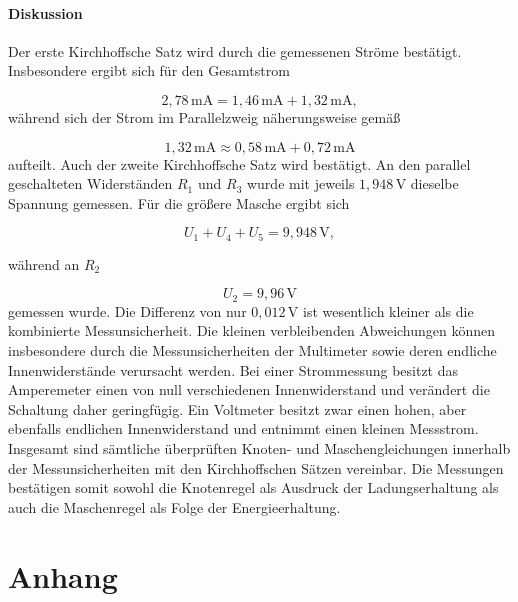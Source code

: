 \documentclass{report}
\begin{document}
\subsubsection{Diskussion}
\noindent
Der erste Kirchhoffsche Satz wird durch die gemessenen Ströme bestätigt.
Insbesondere ergibt sich für den Gesamtstrom

\begin{equation}
2{,}78\,\mathrm{mA}
=
1{,}46\,\mathrm{mA}
+
1{,}32\,\mathrm{mA},
\end{equation}
\noindent
während sich der Strom im Parallelzweig näherungsweise gemäß

\begin{equation}
1{,}32\,\mathrm{mA}
\approx
0{,}58\,\mathrm{mA}
+
0{,}72\,\mathrm{mA}
\end{equation}
\noindent
aufteilt.
\noindent
Auch der zweite Kirchhoffsche Satz wird bestätigt. An den parallel geschalteten
Widerständen $R_1$ und $R_3$ wurde mit jeweils $1{,}948\,\mathrm{V}$ dieselbe
Spannung gemessen. Für die größere Masche ergibt sich

\begin{equation}
U_1+U_4+U_5
=
9{,}948\,\mathrm{V},
\end{equation}

während an $R_2$

\begin{equation}
U_2=9{,}96\,\mathrm{V}
\end{equation}
\noindent
gemessen wurde. Die Differenz von nur $0{,}012\,\mathrm{V}$ ist wesentlich
kleiner als die kombinierte Messunsicherheit.
\noindent
Die kleinen verbleibenden Abweichungen können insbesondere durch die
Messunsicherheiten der Multimeter sowie deren endliche Innenwiderstände verursacht
werden. Bei einer Strommessung besitzt das Amperemeter einen von null verschiedenen
Innenwiderstand und verändert die Schaltung daher geringfügig. Ein Voltmeter besitzt
zwar einen hohen, aber ebenfalls endlichen Innenwiderstand und entnimmt einen kleinen
Messstrom.
\noindent
Insgesamt sind sämtliche überprüften Knoten- und Maschengleichungen innerhalb
der Messunsicherheiten mit den Kirchhoffschen Sätzen vereinbar. Die Messungen
bestätigen somit sowohl die Knotenregel als Ausdruck der Ladungserhaltung als
auch die Maschenregel als Folge der Energieerhaltung.







\newpage
\chapter{Anhang}
\end{document}
